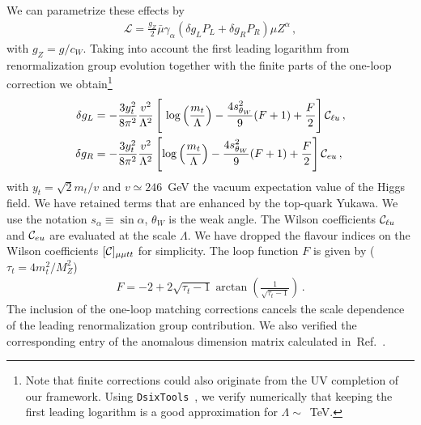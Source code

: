 \documentclass[aps,twocolumn,showpacs,preprintnumbers,amsmath,amssymb,floatfix,nofootinbib]{revtex4-1}
\newcommand{\C}{{\cal C}}
\begin{document}
We can parametrize these effects by     
%
\begin{align}  \label{Zlag}
\mathcal{L} = \frac{g_Z}{2}  \bar \mu    \gamma_{\alpha}   \left(    \delta g_L  P_L    +    \delta g_R    P_R   \right) \mu Z^{\alpha}   \,,
\end{align}
with $g_Z = g/c_W$.   Taking into account the first leading logarithm from renormalization group evolution together with the finite parts of the one-loop correction we obtain\footnote{Note that finite corrections could also originate from the UV completion of our framework.  Using \texttt{DsixTools}~\cite{Celis:2017hod}, we verify numerically that keeping the first leading logarithm is a good approximation for $\Lambda \sim$~TeV.}
%
\begin{align}
\delta g_L  &=  -  \frac{3   y_t^2 }{8  \pi^2  }       \frac{v^2}{\Lambda^2}     \left[  \mathrm{log} \left( \frac{m_t}{\Lambda} \right)      -  \frac{4 s_{\theta_W}^2}{9}  (F +1)  +  \frac{F}{2}              \right] \C_{\ell u} \,, \nonumber \\
\delta g_R   &=  -  \frac{3   y_t^2 }{8  \pi^2  }       \frac{v^2}{\Lambda^2} \left[   \mathrm{log} \left( \frac{m_t}{\Lambda} \right)  -  \frac{4 s_{\theta_W}^2}{9}  (F +1)  +  \frac{F}{2} \right]  \C_{e u} \,,
\end{align}
%
with $y_t = \sqrt{2} m_t/v$ and $v \simeq 246$~GeV the vacuum expectation value of the Higgs field.  We have retained terms that are enhanced by the top-quark Yukawa.   We use the notation $s_\alpha \equiv \sin \alpha$, $\theta_W$ is the weak angle. The Wilson coefficients $\C_{\ell u}$ and $\C_{eu}$ are evaluated at the scale $\Lambda$.   We have dropped the flavour indices on the Wilson coefficients $[\C]_{\mu \mu tt}$ for simplicity.    The loop function $F$ is given by ($\tau_t = 4 m_t^2/M_Z^2$)
%
\begin{align}
F  =  -2  + 2 \sqrt{\tau_t -1} \arctan \left(  \frac{1}{\sqrt{\tau_t -1}}\right)    \,.
\end{align}
%
The inclusion of the one-loop matching corrections cancels the scale dependence of the leading renormalization group contribution.  We also verified the corresponding entry of the anomalous dimension matrix calculated in~Ref.~\cite{Jenkins:2013wua}.
\end{document}
